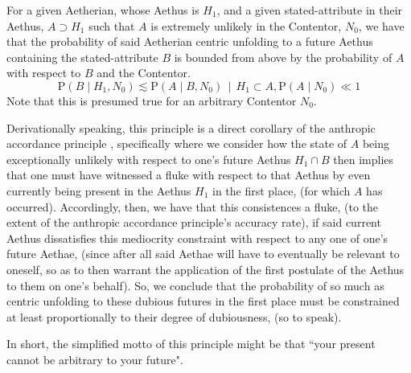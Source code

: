 \begin{prince}
    For a given Aetherian, whose Aethus is $H_1$, and a given stated-attribute in their Aethus, $A \supset H_1$ such that $A$ is extremely unlikely in the Contentor, $N_0$, we have that the probability of said Aetherian centric unfolding to a future Aethus containing the stated-attribute $B$ is bounded from above by the probability of $A$ with respect to $B$ and the Contentor. 
    \begin{equation}
        \left. \mathrm{P} \! \left( B \mid H_1, N_0 \right) \lesssim \mathrm{P} \! \left( A \mid B, N_0 \right) \, \middle| \, H_1 \subset A, \mathrm{P} \! \left( A \mid N_0 \right) \ll 1 \right.
    \end{equation}
    Note that this is presumed true for an arbitrary Contentor $N_0$. 

    Derivationally speaking, this principle is a direct corollary of the anthropic accordance principle \cite{Nexus}, specifically where we consider how the state of $A$ being exceptionally unlikely with respect to one's future Aethus $H_1 \cap B$ then implies that one must have witnessed a fluke with respect to that Aethus by even currently being present in the Aethus $H_1$ in the first place, (for which $A$ has occurred). Accordingly, then, we have that this consistences a fluke, (to the extent of the anthropic accordance principle's accuracy rate), if said current Aethus dissatisfies this mediocrity constraint with respect to any one of one's future Aethae, (since after all said Aethae will have to eventually be relevant to oneself, so as to then warrant the application of the first postulate of the Aethus to them on one's behalf). So, we conclude that the probability of so much as centric unfolding to these dubious futures in the first place must be constrained at least proportionally to their degree of dubiousness, (so to speak). 

    In short, the simplified motto of this principle might be that ``your present cannot be arbitrary to your future". 
\end{prince}


